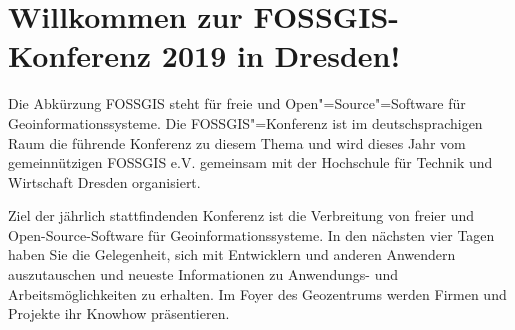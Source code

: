 \newpage
\section*{Willkommen zur FOSSGIS-Konferenz 2019 in Dresden!} \label{welcome}
Die Abkürzung FOSSGIS steht für freie und Open"=Source"=Software für Geoinformationssysteme.
Die FOSSGIS"=Konferenz ist im deutschsprachigen Raum die führende Konferenz zu diesem Thema
und wird dieses Jahr vom gemeinnützigen FOSSGIS e.V.
gemeinsam mit der Hochschule für Technik und Wirtschaft Dresden organisiert.

Ziel der jährlich stattfindenden Konferenz ist die Verbreitung von freier und
Open-Source-Software für Geoinformationssysteme. In den nächsten vier Tagen
haben Sie die Gelegenheit, sich mit Entwicklern und anderen Anwendern auszutauschen und
neueste Informationen zu Anwendungs- und Arbeitsmöglichkeiten zu erhalten. Im
Foyer des Geozentrums werden Firmen und Projekte ihr Knowhow präsentieren.

\newpage

%

